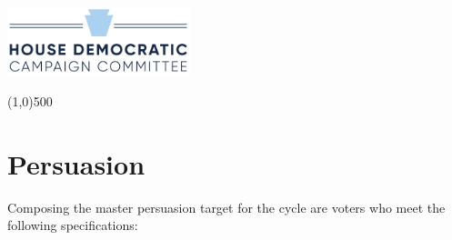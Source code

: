 \documentclass[12pt]{article}
\begin{document}
\begin{center}
    \includegraphics[width=0.4\textwidth]{HDCC}
\end{center}

\begin{center}
    \line(1,0){500}
\end{center}

\section*{Persuasion}

Composing the master persuasion target for the cycle are voters who meet the following specifications: 
\end{document}
